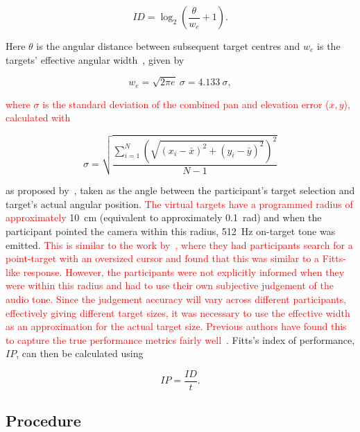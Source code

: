 \documentclass[acmsmall]{acmart}
\newcommand\hl[1]{\textcolor{red}{#1}}
\begin{document}
\begin{equation}
  \label{eq:fitts-id}
  ID = \log_2\left(\frac{\theta}{w_e} + 1\right).
\end{equation}

\noindent
Here $\theta$ is the angular distance between subsequent target centres and $w_e$ is the targets' effective angular width~\citep{welford1968fundamentals}, given by

\begin{equation}
  \label{eq:fitts-we} w_e = \sqrt{2\pi e}~\sigma = 4.133~\sigma,
\end{equation}

\noindent \hl{where $\sigma$ is the standard deviation of the combined pan and elevation error ($x, y$), calculated with}

\begin{equation}
  \sigma = \sqrt{\frac{\sum_{i=1}^{N}\left(\sqrt{(x_i-\bar{x})^2 + (y_i - \bar{y})^2}\right)^2}{N-1}}
\end{equation}

\noindent as proposed by~\citet{wobbrock2011effects}, taken as the angle between the participant's target selection and target's actual angular position.
\hl{The virtual targets have a programmed radius of approximately} \SI{10}{\centi\metre} (equivalent to approximately \SI{0.1}{\radian}) and when the participant pointed the camera within this radius, \SI{512}{\hertz} on-target tone was emitted.
\hl{This is similar to the work by}~\citet{kabbash1995prince}\hl{, where they had participants search for a point-target with an oversized cursor and found that this was similar to a Fitts-like response.
However, the participants were not explicitly informed when they were within this radius and had to use their own subjective judgement of the audio tone.
Since the judgement accuracy will vary across different participants, effectively giving different target sizes, it was necessary to use the effective width as an approximation for the actual target size.
Previous authors have found this to capture the true performance metrics fairly well}~\citep{zhai2004speed}.
Fitts's index of performance, $IP$, can then be calculated using 

\begin{equation}
  \label{eq:fitts-performance}
  IP = \frac{ID}{t}.
\end{equation}

\subsection{Procedure}
\end{document}
